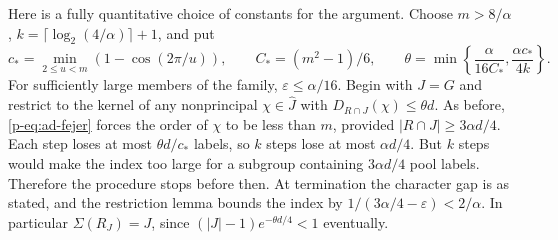 \documentclass[11pt,a4paper]{article}
\theoremstyle{definition}
\theoremstyle{remark}
\begin{document}
Here is a fully quantitative choice of constants for the argument.
Choose $m>8/\alpha$,
$k=\lceil\log_2(4/\alpha)\rceil+1$, and put
\[
 c_* =\min_{2\leq u<m}(1-\cos(2\pi/u)),\qquad
 C_*=(m^2-1)/6,
 \qquad
 \theta=\min\left\{\frac{\alpha}{16C_*},
                         \frac{\alpha c_*}{4k}\right\}.
\]
For sufficiently large members of the family, $\varepsilon\leq\alpha/16$.
Begin with $J=G$ and restrict to the kernel of any nonprincipal
$\chi\in\widehat J$ with $D_{R\cap J}(\chi)\leq\theta d$.
As before, \eqref{p-eq:ad-fejer} forces the order of $\chi$ to be less
than $m$, provided $|R\cap J|\geq3\alpha d/4$.
Each step loses at most $\theta d/c_*$ labels, so $k$ steps lose at
most $\alpha d/4$. But $k$ steps would make the index too large for a
subgroup containing $3\alpha d/4$ pool labels. Therefore the procedure
stops before then. At termination the character gap is as stated,
and the restriction lemma bounds the index by
$1/(3\alpha/4-\varepsilon)<2/\alpha$.
In particular $\Sigma(R_J)=J$, since
$(|J|-1)e^{-\theta d/4}<1$ eventually.
\end{document}
